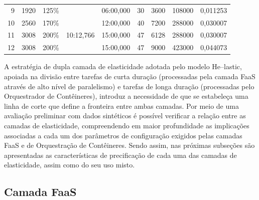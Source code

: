 \documentclass[english,brazilian]{UNISINOSmonografia} %
\newcommand\defaultFigureWidth{0.9}
\begin{document}
\begin{table}[tb]
\begin{minipage}{\defaultFigureWidth\textwidth}
\begin{tabularx}{\textwidth}{rrrrrWWrr}
			9 & 1920 & 125\% &  & 06:00,000 & 30 & 3600 & 108000 & 0,011253 \\
			10 & 2560 & 170\% &  & 12:00,000 & 40 & 7200 & 288000 & 0,030007 \\
			11 & 3008 & 200\% & 10:12,766 & 15:00,000 & 47 & 6128 & 288000 & 0,030007 \\
			12 & 3008 & 200\% &  & 15:00,000 & 47 & 9000 & 423000 & 0,044073 \\ 
			\bottomrule
		\end{tabularx}
	\end{minipage}
\end{table}



A estratégia de dupla camada de elasticidade adotada pelo modelo \textsf{He}--lastic, apoiada na divisão entre tarefas de curta duração (processadas pela camada FaaS através de alto nível de paralelismo) e tarefas de longa duração (processadas pelo Orquestrador de Contêineres), introduz a necessidade de que se estabeleça uma linha de corte que define a fronteira entre ambas camadas.
%
Por meio de uma avaliação preliminar com dados sintéticos é possível verificar a relação entre as camadas de elasticidade, compreendendo em maior profundidade as implicações associadas a cada um dos parâmetros de configuração exigidos pelas camadas FaaS e de Orquestração de Contêineres.
%
Sendo assim, nas próximas subseções são apresentadas as características de precificação de cada uma das camadas de elasticidade, assim como do seu uso misto.





\subsection{Camada FaaS}
\label{sec:modelo-custben-faas}
\end{document}
